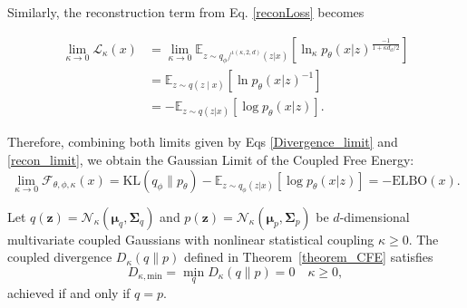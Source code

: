 \documentclass[twoside,11pt]{article}
\renewenvironment{proof}{\par\noindent{\bf Proof\ }}{\hfill\BlackBox\par\vspace{2mm}}
\begin{document}
\begin{proof}
Similarly, the reconstruction term from Eq. \eqref{reconLoss} becomes

\begin{equation} \label{recon_limit}
    \begin{split}
\lim_{\kappa\to0}
\mathcal{L}_\kappa(x)
& =
\lim_{\kappa\to0}
\mathbb{E}_{z\sim q_{\phi}/^{\iota(\kappa,2,d)}(z|x)}
\left[\ln_\kappa p_{\theta}(x|z)^{\frac{-1}{1+\kappa d_d/2}}
\right]
\\
& = \mathbb{E}_{z\sim q(z \mid x)}
\left[\ln p_{\theta}(x|z)^{-1}\right]
\\
& = -\mathbb{E}_{z\sim q(z|x)}[\log p_\theta(x|z)].
    \end{split}
\end{equation}

Therefore, combining both limits given by Eqs \eqref{Divergence_limit} and \eqref{recon_limit},  we obtain the Gaussian Limit of the Coupled Free Energy:
\[
\lim_{\kappa\to0}
\mathcal{F}_{\theta,\phi,\kappa}(x)
=
\mathrm{KL}(q_\phi\|p_\theta)
-
\mathbb{E}_{z\sim q_\phi(z|x)}
[\log p_\theta(x|z)]
=
-\mathrm{ELBO}(x).
\]
\end{proof}

\begin{theorem}
\label{thm:CoupledDivMinimum}
Let $q(\mathbf{z}) = \mathcal{N}_\kappa(\boldsymbol{\mu}_q, \boldsymbol{\Sigma}_q)$ and $p(\mathbf{z}) = \mathcal{N}_\kappa(\boldsymbol{\mu}_p, \boldsymbol{\Sigma}_p)$ be $d$-dimensional multivariate coupled Gaussians with nonlinear statistical coupling $\kappa \ge 0$. The coupled divergence $D_\kappa(q \parallel p)$ defined in Theorem~\ref{theorem_CFE} satisfies
\begin{equation}
D_{\kappa,\text{min}} = \min_{q} D_\kappa(q \parallel p) = 0 \quad \kappa \geq 0,
\end{equation}
achieved if and only if $q = p$. 
\end{theorem}
\end{document}
